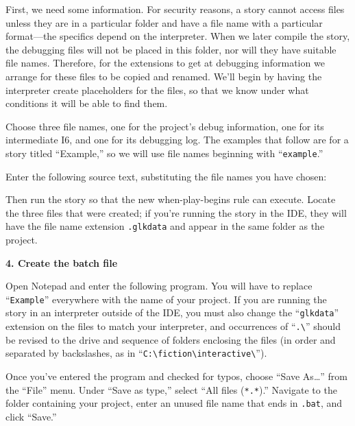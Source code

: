 \documentclass{book}
\begin{document}
First, we need some information.  For security reasons, a story cannot access
files unless they are in a particular folder and have a file name with a
particular format---the specifics depend on the interpreter.  When we later
compile the story, the debugging files will not be placed in this folder, nor
will they have suitable file names.  Therefore, for the extensions to get at
debugging information we arrange for these files to be copied and renamed.
We'll begin by having the interpreter create placeholders for the files, so that
we know under what conditions it will be able to find them.

Choose three file names, one for the project's debug information, one for its
intermediate I6, and one for its debugging log.  The examples that follow are
for a story titled ``Example,'' so we will use file names beginning with
``\texttt{example}.''

Enter the following source text, substituting the file names you have chosen:

\begin{quote}
  
\end{quote}

Then run the story so that the new when-play-begins rule can execute.  Locate
the three files that were created; if you're running the story in the IDE, they
will have the file name extension \texttt{.glkdata} and appear in the same
folder as the project.

\textbf{4. Create the batch file}

Open Notepad and enter the following program.  You will have to replace
``\texttt{Example}'' everywhere with the name of your project.  If you are
running the story in an interpreter outside of the IDE, you must also change the
``\texttt{glkdata}'' extension on the files to match your interpreter, and
occurrences of ``\lstinline{.\}'' should be revised to the drive and sequence of
  folders enclosing the files (in order and separated by backslashes, as in
  ``\lstinline{C:\fiction\interactive\}'').

\begin{quote}
  
\end{quote}

Once you've entered the program and checked for typos, choose ``Save As\dots''
from the ``File'' menu.  Under ``Save as type,'' select ``All files
(\texttt{*.*}).''  Navigate to the folder containing your project, enter an
unused file name that ends in \texttt{.bat}, and click ``Save.''
\end{document}
